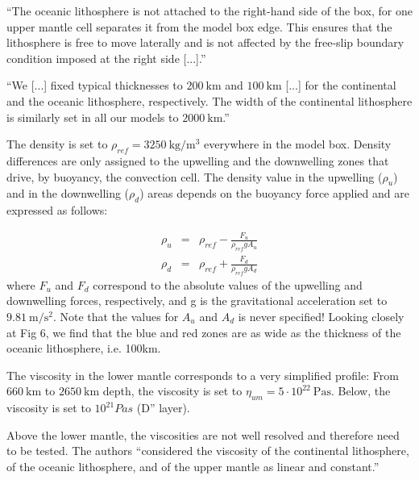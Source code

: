 ``The oceanic lithosphere is not attached
to the right-hand side of the box, for one upper mantle cell
separates it from the model box edge. This ensures that the
lithosphere is free to move laterally and is not affected by
the free-slip boundary condition imposed at the right side [...].''

``We [...] fixed typical thicknesses to
$200~\si{\km}$ and $100~\si{\km}$ [...] for the continental and the oceanic lithosphere, 
respectively. The width of the continental lithosphere is similarly
set in all our models to $2000~\si{\km}$.''

The density is set to $\rho_{ref}=3250~\si{\kg\per\cubic\meter}$ everywhere in the model box. Density
differences are only assigned to the upwelling and the
downwelling zones that drive, by buoyancy, the convection
cell. The density value in the upwelling ($\rho_u$) and
in the downwelling ($\rho_d$) areas depends on the buoyancy force
applied and are expressed as follows:

\begin{eqnarray}
\rho_u &=& \rho_{ref} - \frac{F_u}{\rho_{ref} g A_u} \\
\rho_d &=& \rho_{ref} + \frac{F_d}{\rho_{ref} g A_d} 
\end{eqnarray}
where $F_u$ and $F_d$ correspond to the absolute values of the 
upwelling and downwelling forces, respectively, and g is the gravitational 
acceleration set to $9.81~\si{\meter\per\square\second}$.
Note that the values for $A_u$ and $A_d$ is never specified!
Looking closely at Fig 6, we find that the blue and red zones are as wide as 
the thickness of the oceanic lithosphere, i.e. 100km.


The viscosity in the lower mantle corresponds
to a very simplified profile: From $660~\si{\km}$ to $2650~\si{\km}$ depth,
the viscosity is set to $\eta_{um}=5\cdot 10^{22}~\si{\pascal\second}$. 
Below, the viscosity is set to $10^{21} Pa s$ (D'' layer). 

Above the lower mantle, the viscosities
are not well resolved and therefore need to be tested.
The authors ``considered the viscosity of the continental 
lithosphere, of the oceanic lithosphere, and of the
upper mantle as linear and constant.''

